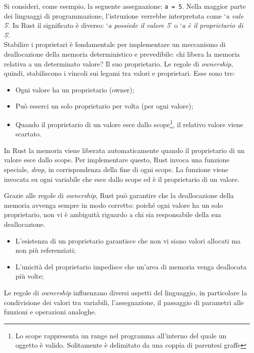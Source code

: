 Si consideri, come esempio, la seguente assegnazione: \texttt{a = 5}.
Nella maggior parte dei linguaggi di programmazione, l'istruzione verrebbe interpretata come `\textit{a vale 5}'. In Rust il significato è diverso: `\textit{a possiede il valore 5}' o `\textit{a è il proprietario di 5}'. \\
\indent Stabilire i proprietari è fondamentale per implementare un meccanismo di deallocazione della memoria deterministico e prevedibile: chi libera la memoria relativa a un determinato valore? Il suo proprietario. \break \break
\noindent Le regole di \textit{ownership}, quindi, stabiliscono i vincoli sui legami tra valori e proprietari. Esse sono tre:
\begin{itemize}
    \item Ogni valore ha un proprietario (owner);
    \item Può esserci un solo proprietario per volta (per ogni valore);
    \item Quando il proprietario di un valore esce dallo scope\footnote{Lo scope rappresenta un range nel programma all'interno del quale un oggetto è valido. Solitamente è delimitato da una coppia di parentesi graffe}, il relativo valore viene scartato.
\end{itemize}

\noindent In Rust la memoria viene liberata automaticamente quando il proprietario di un valore esce dallo scope. Per implementare questo, Rust invoca una funzione speciale, \textit{drop}, in corrispondenza della fine di ogni scope. La funzione viene invocata su ogni variabile che esce dallo scope ed è il proprietario di un valore.

Grazie alle regole di \textit{ownership}, Rust può garantire che la deallocazione della memoria avvenga sempre in modo corretto: poiché ogni valore ha un solo proprietario, non vi è ambiguità riguardo a chi sia responsabile della sua deallocazione.
\begin{itemize}
    \item L'esistenza di un proprietario garantisce che non vi siano valori allocati ma non più referenziati;
    \item L'unicità del proprietario impedisce che un'area di memoria venga deallocata più volte;
\end{itemize}

\noindent Le regole di \textit{ownership} influenzano diversi aspetti del linguaggio, in particolare la condivisione dei valori tra variabili, l'assegnazione, il passaggio di parametri alle funzioni e operazioni analoghe.

